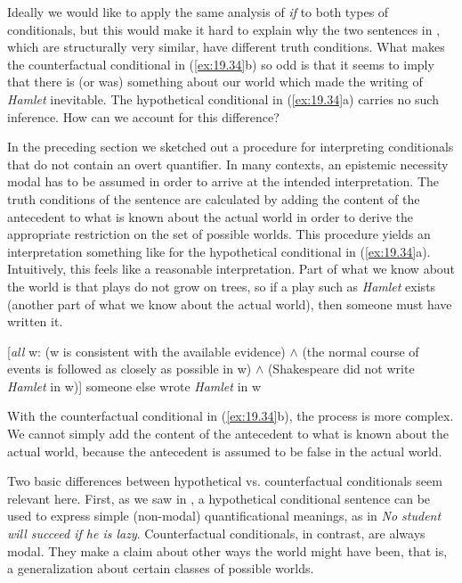 Ideally we would like to apply the same analysis of \textit{if} to both types of conditionals, but this would make it hard to explain why the two sentences in , which are structurally very similar, have different truth conditions. What makes the counterfactual conditional in (\ref{ex:19.34}b) so odd is that it seems to imply that there is (or was) something about our world which made the writing of \textit{Hamlet} inevitable. The hypothetical conditional in (\ref{ex:19.34}a) carries no such inference. How can we account for this difference?


In the preceding section we sketched out a procedure for interpreting conditionals that do not contain an overt quantifier. In many contexts, an epistemic necessity modal has to be assumed in order to arrive at the intended interpretation. The truth conditions of the sentence are calculated by adding the content of the antecedent to what is known about the actual world in order to derive the appropriate restriction on the set of possible worlds. This procedure yields an interpretation something like  for the hypothetical conditional in (\ref{ex:19.34}a). Intuitively, this feels like a reasonable interpretation. Part of what we know about the world is that plays do not grow on trees, so if a play such as \textit{Hamlet} exists (another part of what we know about the actual world), then someone must have written it.


\ea \label{ex:19.35}
{}[\textit{all} w: (w is consistent with the available evidence) $\wedge$ (the normal course of events is followed as closely as possible in w) $\wedge$ (Shakespeare did not write \textit{Hamlet} in w)] someone else wrote \textit{Hamlet} in w
\z


With the counterfactual conditional in (\ref{ex:19.34}b), the process is more complex. We cannot simply add the content of the antecedent to what is known about the actual world, because the antecedent is assumed to be false in the actual world. 


Two basic differences between hypothetical vs. counterfactual  conditionals seem relevant here. First, as we saw in , a hypothetical conditional sentence can be used to express simple (non-modal) quantificational meanings, as in \textit{No student will succeed if he is lazy}. Counterfactual  conditionals, in contrast, are always modal. They make a claim about other ways the world might have been, that is, a generalization about certain classes of possible worlds.


